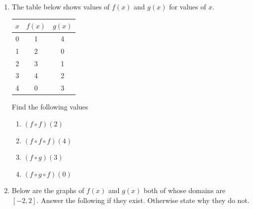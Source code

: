 \documentclass[12pt]{article}
\begin{document}
 

\begin{enumerate}

\item The table below shows values of $f(x)$ and $g(x)$ for values of $x$. 

\begin{table}[h!]
    \centering
    \begin{tabular}{|c|c|c|}
        \hline
        \( x \) & \( f(x) \) & \( g(x) \) \\
        \hline
        0 & 1 & 4 \\
        1 & 2 & 0 \\
        2 & 3 & 1 \\
        3 & 4 & 2 \\
        4 & 0 & 3 \\
        \hline
    \end{tabular}
\end{table}
Find the following values
\begin{enumerate}
\item $(f\circ f)(2)$\\
\vfill
\item $(f\circ f\circ f)(4)$
\vfill
\item $(f\circ g)(3)$
\vfill
\item $(f\circ g\circ f)(0)$
\vfill
\end{enumerate}

\pagebreak

\item Below are the graphs of $f(x)$ and $g(x)$ both of whose domains are $[-2,2]$. Answer the following if they exist. Otherwise state why they do not.

\begin{center}
\end{center}



\end{enumerate}
\end{document}
